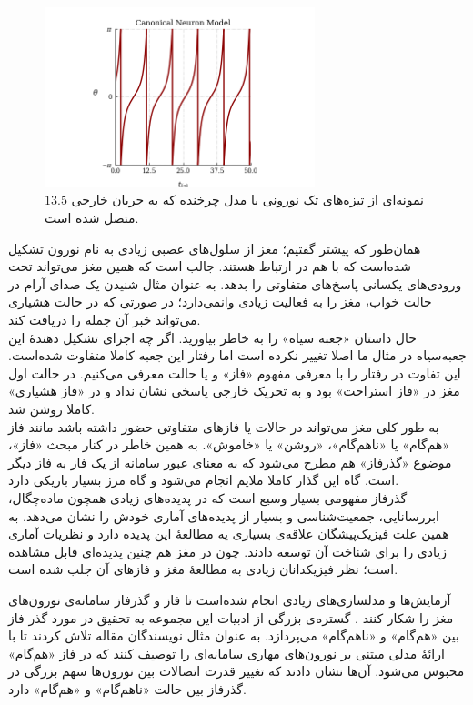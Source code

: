 \begin{figure}
	\centering
	\includegraphics[width=0.7\textwidth]{Figures/canonical_model_spike_pattern.png}
	\caption{
		نمونه‌ای از تیزه‌های تک نورونی با مدل چرخنده که به جریان خارجی
$13.5$
 متصل شده است.}
	\label{fig:canonical_model_spike_pattern}
\end{figure}
همان‌طور که پیشتر گفتیم؛ مغز از سلول‌های عصبی زیادی به نام نورون تشکیل شده‌است که با هم در ارتباط هستند. جالب است که همین مغز می‌تواند تحت ورودی‌های یکسانی پاسخ‌های متفاوتی را بدهد. به عنوان مثال شنیدن یک صدای آرام در حالت خواب، مغز را به فعالیت زیادی وانمی‌دارد؛ در صورتی که در حالت هشیاری می‌تواند خبر آن جمله را دریافت کند.\\
حال داستان «جعبه سیاه» را به خاطر بیاورید. اگر چه اجزای تشکیل دهندهٔ این جعبه‌سیاه در مثال ما اصلا تغییر نکرده است اما رفتار این جعبه کاملا متفاوت شده‌است. این تفاوت در رفتار را با معرفی مفهوم «فاز» و یا حالت معرفی می‌کنیم. در حالت اول مغز در «فاز استراحت» بود و به تحریک خارجی پاسخی نشان نداد و در «فاز هشیاری» کاملا روشن شد.\\
به طور کلی مغز می‌تواند در حالات یا فازهای متفاوتی حضور داشته باشد مانند فاز «هم‌گام» یا «ناهم‌گام»، «روشن» یا «خاموش». به همین خاطر در کنار مبحث «فاز»، موضوع «گذرفاز» هم مطرح می‌شود که به معنای عبور سامانه از یک فاز به فاز دیگر است. گاه این گذار کاملا ملایم انجام می‌شود و گاه مرز بسیار باریکی دارد.\\

گذرفاز مفهومی بسیار وسیع است که در پدیده‌های زیادی همچون ماده‌چگال، ابررسانایی، جمعیت‌شناسی و بسیار از پدیده‌های آماری خودش را نشان می‌دهد. به همین علت فیزیک‌پیشگان علاقه‌ی بسیاری یه مطالعهٔ این پدیده دارد و نظریات آماری زیادی را برای شناخت آن توسعه دادند. چون در مغز هم چنین پدیده‌ای قابل مشاهده است؛ نظر فیزیکدانان زیادی به مطالعهٔ مغز و فازهای آن جلب شده است.

آزمایش‌ها و مدلسازی‌های زیادی انجام شده‌است تا فاز و گذرفاز سامانه‌ی نورون‌های مغز را شکار کنند 
\cite{WILTING2019105}.
گستره‌ی بزرگی از ادبیات این مجموعه به تحقیق در مورد گذر فاز بین «هم‌گام» و «نا‌هم‌گام» می‌پردازد. به عنوان مثال نویسندگان مقاله
\cite{PhysRevLett.105.158104}
تلاش کردند تا با ارائهٔ مدلی مبتنی بر نورون‌های مهاری سامانه‌ای را توصیف کنند که در فاز «هم‌گام» محبوس می‌شود. آن‌ها نشان دادند که تغییر قدرت اتصالات بین نورون‌ها سهم بزرگی در گذرفاز بین حالت «ناهم‌گام» و «هم‌گام» دارد.

